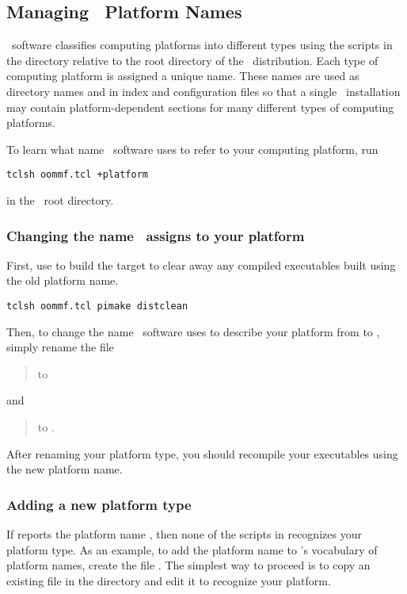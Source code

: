 \subsection{Managing \OOMMF\ Platform Names}\label{sec:install.platformnames}

\OOMMF\ software classifies computing platforms into different types
using the scripts in the directory  relative to the
root directory of the \OOMMF\ distribution.
Each type of computing platform is assigned a unique name.
These names are used as directory names
and in index and configuration files so that a single
\OOMMF\ installation may contain platform-dependent sections for many
different types of computing platforms.

To learn what name \OOMMF\ software uses to refer to your computing
platform, run
\begin{verbatim}
tclsh oommf.tcl +platform
\end{verbatim}
in the \OOMMF\ root directory.

\subsubsection{Changing the name \OOMMF\ assigns to your platform}
First, use
to build the target  to
clear away any compiled executables built using the old platform
name.
\begin{verbatim}
tclsh oommf.tcl pimake distclean
\end{verbatim}
Then, to change the name \OOMMF\ software uses to describe your platform from
 to , simply rename the file
\begin{quote}
\hspace{1em} to \hspace{1em}
\end{quote}
and
\begin{quote}
\hspace{1em} to \hspace{1em}
.
\end{quote}
After renaming your platform type, you should recompile your executables
using the new platform name.

\subsubsection{Adding a new platform type}
If  reports the platform name
, then none of the scripts in 
recognizes your platform type.  As an example, to add the platform
name  to \OOMMF's vocabulary of platform names, create the
file .  The simplest way to proceed is to
copy an existing file in the directory  and edit it
to recognize your platform.


